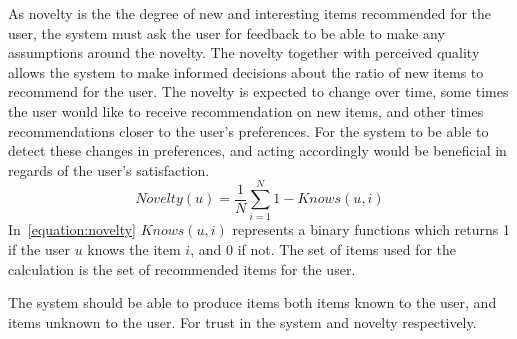 As novelty is the the degree of new and interesting items recommended for the user, the system must ask the user for feedback to be able to make any assumptions around the novelty.
The novelty together with perceived quality allows the system to make informed decisions about the ratio of new items to recommend for the user.
The novelty is expected to change over time, some times the user would like to receive recommendation on new items, and other times recommendations closer to the user's preferences.
For the system to be able to detect these changes in preferences, and acting accordingly would be beneficial in regards of the user's satisfaction.
\begin{equation}
    Novelty(u) = \frac{1}{N}\sum_{i=1}^{N}{1 - Knows(u,i)}
    \label{equation:novelty}
\end{equation}
In~\ref{equation:novelty} $Knows(u,i)$ represents a binary functions which returns 1 if the user $u$ knows the item $i$, and 0 if not.
The set of items used for the calculation is the set of recommended items for the user.

The system should be able to produce items both items known to the user, and items unknown to the user.
For trust in the system and novelty respectively.


